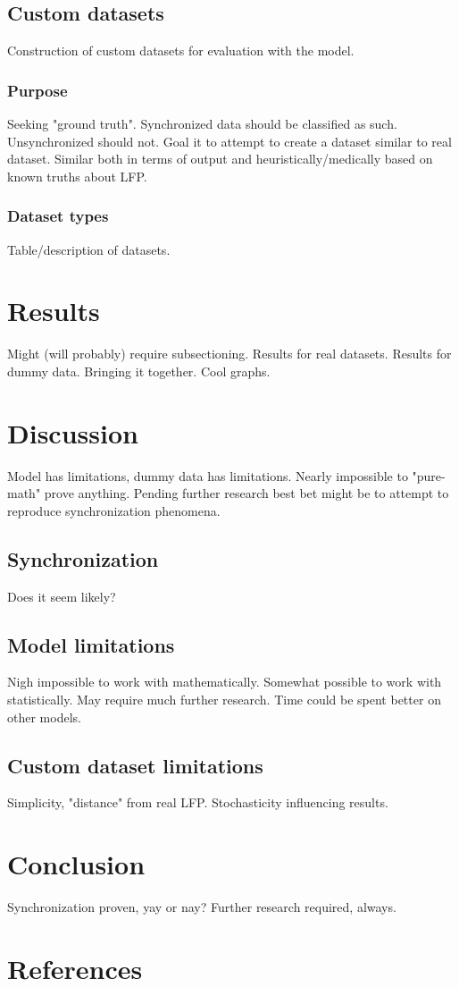 \documentclass{article}
\begin{document}
\subsection{Custom datasets}
Construction of custom datasets for evaluation with the model.

\subsubsection{Purpose}
Seeking "ground truth".
Synchronized data should be classified as such.
Unsynchronized should not.
Goal it to attempt to create a dataset similar to real dataset.
Similar both in terms of output and heuristically/medically based on known truths about LFP.

\subsubsection{Dataset types}
Table/description of datasets.

\newpage
\section{Results}
Might (will probably) require subsectioning.
Results for real datasets.
Results for dummy data.
Bringing it together.
Cool graphs.

\newpage
\section{Discussion}
Model has limitations, dummy data has limitations.
Nearly impossible to "pure-math" prove anything.
Pending further research best bet might be to attempt to reproduce synchronization phenomena.

\subsection{Synchronization}
Does it seem likely?

\subsection{Model limitations}
Nigh impossible to work with mathematically.
Somewhat possible to work with statistically.
May require much further research.
Time could be spent better on other models.

\subsection{Custom dataset limitations}
Simplicity, "distance" from real LFP.
Stochasticity influencing results.

\newpage
\section{Conclusion}
Synchronization proven, yay or nay?
Further research required, always.

\newpage
\section{References}

\end{document}
